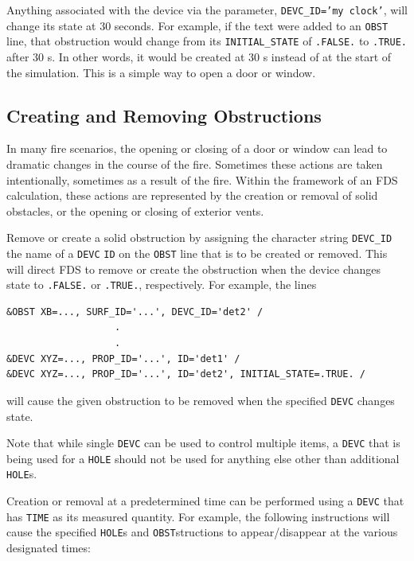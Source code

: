 \documentclass[11pt]{book}
\newcommand{\ct}{\tt\small}
\begin{document}
\noindent
Anything associated with the device via the parameter, {\ct DEVC\_ID='my clock'}, will change its state at 30 seconds. For example,
if the text were added to an {\ct OBST} line, that obstruction would change from its {\ct INITIAL\_STATE} of {\ct .FALSE.} to {\ct .TRUE.} after
30 s. In other words, it would be created at 30 s instead of at the start of the simulation. This is a simple way to open a door or window.


\subsection{Creating and Removing Obstructions}
\label{info:create_remove}
In many fire scenarios, the opening or closing of a door or window
can lead to dramatic changes in the course of the fire. Sometimes these
actions are taken intentionally, sometimes as a result of the fire.
Within the framework of an FDS calculation, these actions are
represented by the creation or removal of solid obstacles, or the
opening or closing of exterior vents.

Remove or create a solid obstruction by assigning the character string {\ct DEVC\_ID} the name of
a {\ct DEVC} {\ct ID} on the {\ct OBST} line that is to be created or removed.  This will direct
FDS to remove or create the obstruction when
the device changes state to {\ct .FALSE.} or {\ct .TRUE.}, respectively. For example, the lines

\footnotesize
\begin{verbatim}
&OBST XB=..., SURF_ID='...', DEVC_ID='det2' /
                   .
                   .
&DEVC XYZ=..., PROP_ID='...', ID='det1' /
&DEVC XYZ=..., PROP_ID='...', ID='det2', INITIAL_STATE=.TRUE. /
\end{verbatim}
\normalsize

\noindent
will cause the given obstruction to be removed when the specified {\ct DEVC} changes state.

\begin{warning}
\noindent
Note that while single {\ct DEVC} can be used to control multiple items, a {\ct DEVC}
that is being used for a {\ct HOLE} should not be used for anything else other than additional {\ct HOLE}s.
\end{warning}

\noindent
Creation or removal at a predetermined time can be performed using a {\ct DEVC} that has {\ct TIME} as
its measured quantity. For example, the following instructions will cause the specified {\ct HOLE}s and {\ct OBST}structions to
appear/disappear at the various designated times:
\end{document}
